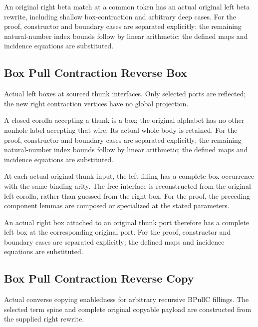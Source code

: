 An original right beta match at a common token has an actual original left beta rewrite, including shallow box-contraction and arbitrary deep cases.
For the proof, constructor and boundary cases are separated explicitly; the remaining natural-number index bounds follow by linear arithmetic; the defined maps and incidence equations are substituted.
\par{}

\subsection{Box Pull Contraction Reverse Box}
Actual left boxes at sourced thunk interfaces. Only selected ports are reflected; the new right contraction vertices have no global projection.

A closed corolla accepting a thunk is a box; the original alphabet has no other nonhole label accepting that wire. Its actual whole body is retained.
For the proof, constructor and boundary cases are separated explicitly; the remaining natural-number index bounds follow by linear arithmetic; the defined maps and incidence equations are substituted.
\par{}

At each actual original thunk input, the left filling has a complete box occurrence with the same binding arity. The free interface is reconstructed from the original left corolla, rather than guessed from the right box.
For the proof, the preceding component lemmas are composed or specialized at the stated parameters.
\par{}

An actual right box attached to an original thunk port therefore has a complete left box at the corresponding original port.
For the proof, constructor and boundary cases are separated explicitly; the defined maps and incidence equations are substituted.
\par{}

\subsection{Box Pull Contraction Reverse Copy}
Actual converse copying enabledness for arbitrary recursive BPullC fillings. The selected term spine and complete original copyable payload are constructed from the supplied right rewrite.

